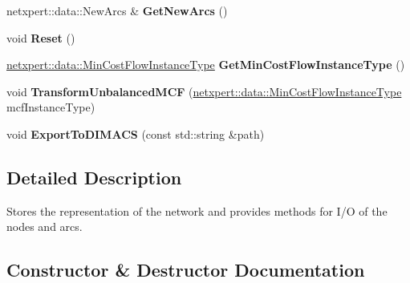 \begin{DoxyCompactItemize}
\item 
netxpert\+::data\+::\+New\+Arcs \& {\bfseries Get\+New\+Arcs} ()\hypertarget{classnetxpert_1_1Network_afbe97a6b25183b6f8411787d999b5924}{}\label{classnetxpert_1_1Network_afbe97a6b25183b6f8411787d999b5924}

\item 
void {\bfseries Reset} ()\hypertarget{classnetxpert_1_1Network_a7547bfa46b085754b62889a783f5e16f}{}\label{classnetxpert_1_1Network_a7547bfa46b085754b62889a783f5e16f}

\item 
\hyperlink{namespacenetxpert_1_1data_a9504ea932b3debceb4ba7f6831e80bbd}{netxpert\+::data\+::\+Min\+Cost\+Flow\+Instance\+Type} {\bfseries Get\+Min\+Cost\+Flow\+Instance\+Type} ()\hypertarget{classnetxpert_1_1Network_aeec7c81b9b3e44060690d318b2b94de7}{}\label{classnetxpert_1_1Network_aeec7c81b9b3e44060690d318b2b94de7}

\item 
void {\bfseries Transform\+Unbalanced\+M\+CF} (\hyperlink{namespacenetxpert_1_1data_a9504ea932b3debceb4ba7f6831e80bbd}{netxpert\+::data\+::\+Min\+Cost\+Flow\+Instance\+Type} mcf\+Instance\+Type)\hypertarget{classnetxpert_1_1Network_a5c87e7744800a188b9709a07d19fe9c7}{}\label{classnetxpert_1_1Network_a5c87e7744800a188b9709a07d19fe9c7}

\item 
void {\bfseries Export\+To\+D\+I\+M\+A\+CS} (const std\+::string \&path)\hypertarget{classnetxpert_1_1Network_a081675d06ff847789245f5a5f8904551}{}\label{classnetxpert_1_1Network_a081675d06ff847789245f5a5f8904551}

\end{DoxyCompactItemize}


\subsection{Detailed Description}
Stores the representation of the network and provides methods for I/O of the nodes and arcs. 

\subsection{Constructor \& Destructor Documentation}
